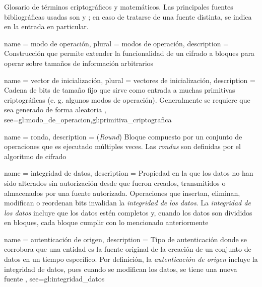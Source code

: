 %
%
%


\makeglossaries

\setglossarypreamble
{%
  Glosario de términos criptográficos y matemáticos. Las principales fuentes
  bibliográficas usadas son \cite{menezes} y \cite{stallings}; en caso de
  tratarse de una fuente distinta, se indica en la entrada en particular.
}

{
  name = modo de operación,
  plural = modos de operación,
  description = {
    Construcción que permite extender la funcionalidad de un cifrado a bloques
    para operar sobre tamaños de información arbitrarios%
  }
}

{
  name = vector de inicialización,
  plural = vectores de inicialización,
  description = {
    Cadena de bits de tamaño fijo que sirve como entrada a muchas primitivas
    criptográficas (e. g. algunos modos de operación). Generalmente
    se requiere que sea generado de forma aleatoria%
  },
  see={gl:modo_de_operacion,gl:primitiva_criptografica}
}

{
  name = ronda,
  description = {
    (\textit{Round}) Bloque compuesto por un conjunto de operaciones que es
    ejecutado múltiples veces. Las \textit{rondas} son definidas por el
    algoritmo de cifrado%
  }
}

{
  name = integridad de datos,
  description = {
    Propiedad en la que los datos no han sido alterados sin autorización desde
    que fueron creados, transmitidos o almacenados por una fuente autorizada.
    Operaciones que insertan, eliminan, modifican o reordenan bits invalidan
    la \textit{integridad de los datos}. La \textit{integridad de los datos}
    incluye que los datos estén completos y, cuando los datos son divididos en
    bloques, cada bloque cumplir con lo mencionado anteriormente%
  }
}

{
  name = autenticación de origen,
  description = {
    Tipo de autenticación donde se corrobora que una entidad es la fuente
    original de la creación de un conjunto de datos en un tiempo específico.
    Por definición, la \textit{autenticación de origen} incluye la integridad
    de datos, pues cuando se modifican los datos, se tiene una nueva fuente%
  },
  see={gl:integridad_datos}
}

